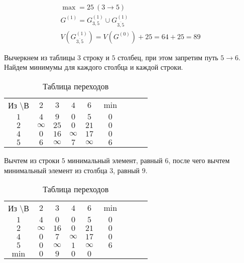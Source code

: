 \begin{gather*}
\max = 25\ (3 \rightarrow 5) \\
G^{(1)} = G_{3,5}^{(1)} \cup G_{\overline{3,5}}^{(1)} \\
V(G_{\overline{3,5}}^{(1)}) = V(G^{(0)}) + 25 = 64 + 25 = 89
\end{gather*}

Вычеркнем из таблицы $3$ строку и $5$ столбец, при этом запретим путь $5 \rightarrow 6$. Найдем минимумы для каждого столбца и каждой строки.

\begin{table}[H]
\begin{center}
	\def\tabcolsep{15pt}
	\caption{Таблица переходов}
	\label{tab:10}
	\begin{tabular}{|c||c|c|c|c|c|c|c|c|}
		\hline
		Из \textbackslash В & $2$ & $3$ & $4$ & $6$ & $\min$ \\
		\hhline{|=#=|=|=|=|=|=|}
		$1$ & $4$ & $9$ & $0$ & $5$ & $0$ \\
		\hline
		$2$ & $\infty$ & $25$ & $0$ & $21$ & $0$ \\
		\hline
		$4$ & $0$ & $16$ & $\infty$ & $17$ & $0$ \\
		\hline
		$5$ & $6$ & $\infty$ & $7$ & $\infty$ & $6$ \\
		\hline
	\end{tabular}
\end{center}
\end{table}

Вычтем из строки $5$ минимальный элемент, равный $6$, после чего вычтем минимальный элемент из столбца $3$, равный $9$.

\begin{table}[H]
\begin{center}
	\def\tabcolsep{15pt}
	\caption{Таблица переходов}
	\label{tab:10}
	\begin{tabular}{|c||c|c|c|c|c|c|c|c|}
		\hline
		Из \textbackslash В & $2$ & $3$ & $4$ & $6$ & $\min$ \\
		\hhline{|=#=|=|=|=|=|=|}
		$1$ & $4$ & $0$ & $0$ & $5$ & $0$ \\
		\hline
		$2$ & $\infty$ & $16$ & $0$ & $21$ & $0$ \\
		\hline
		$4$ & $0$ & $7$ & $\infty$ & $17$ & $0$ \\
		\hline
		$5$ & $0$ & $\infty$ & $1$ & $\infty$ & $6$ \\
		\hhline{|=#=|=|=|=|=|=|}
		$\min$ & $0$ & $9$ & $0$ & $0$ & \\ 
		\hline
	\end{tabular}
\end{center}
\end{table}

